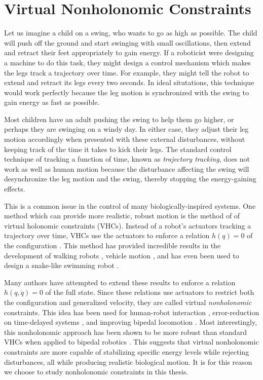\section{Virtual Nonholonomic Constraints}
Let us imagine a child on a swing, who wants to go as high as possible. The
child will push off the ground and start swinging with small oscillations,
then extend and retract their feet appropriately to gain energy. 
If a roboticist were designing a machine to do this task, they might design a
control mechanism which makes the legs track a trajectory over time. For
example, they might tell the robot to extend and retract its legs every two
seconds. In ideal situtations, this technique would work perfectly because the
leg motion is synchronized with the swing to gain energy as fast as possible.

Most children have an adult pushing the swing to help them go higher, or perhaps
they are swinging on a windy day. In either case, they adjust their leg
motion accordingly when presented with these external disturbances, without
keeping track of the time it takes to kick their legs. The
standard control technique of tracking a function of time, known as
\textit{trajectory tracking}, does not work as well as human motion 
because the disturbance affecting the swing will desynchronize the leg motion
and the swing, thereby stopping the energy-gaining effects.

This is a common issue in the control of many biologically-inspired systems. 
One method which can provide more realistic, robust motion is the method of
of virtual holonomic constraints (VHCs). Instead of a robot's actuators tracking
a trajectory over time, VHCs use the actuators to enforce a relation
\(h(q) = 0\) of the configuration \cite{vhcs_for_el_systems}. 
This method has provided incredible results in the development of 
walking robots \cite{vhc_robotic_walking, vhc_stable_walking}, 
vehicle motion \cite{vhc_bicycle, vhc_helicopter}, 
and has even been used to design a snake-like swimming robot
\cite{vhc_snake}.

Many authors have attempted to extend these results to enforce a relation 
\(h(q,\dot{q}) = 0\) of the full state. Since these relations use actuators to
restrict both the configuration and generalized velocity, they are called
virtual \textit{nonholonomic} constraints. This idea has been used for
human-robot interaction
\cite{vnhc_human_robot_cooperation,psd_based_vnhc_redundant_manipulator,haptic_vnhc},
error-reduction on time-delayed systems \cite{vnhc_time_delay_teleop},
and improving bipedal locomotion \cite{nhvc_dynamic_walking,
hybrid_zero_dynamics_bipedal_nhvcs,output_nhvc_bipedal_control}.
Most interestingly, this nonholonomic approach has been shown to be more robust
than standard VHCs when applied to bipedal robotics \cite{nhvc_incline_walking}.
This suggests that virtual nonholonomic constraints are more capable of
stabilizing specific energy levels while rejecting disturbances, all while
producing realistic biological motion. It is for this reason we choose to study
nonholonomic constraints in this thesis.

